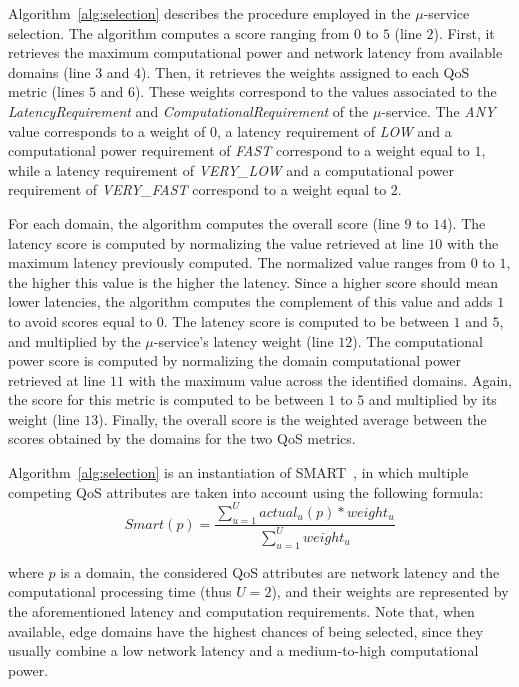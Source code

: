 Algorithm~\ref{alg:selection} describes the procedure employed in the $\mu$-service selection. The algorithm computes a score ranging from $0$ to $5$ (line $2$). First, it retrieves the maximum computational power and network latency from available domains (line $3$ and $4$). Then, it retrieves the weights assigned to each QoS metric (lines $5$ and $6$). These weights correspond to the values associated to the \textit{LatencyRequirement} and \textit{ComputationalRequirement} of the $\mu$-service. The \textit{ANY} value corresponds to a weight of $0$, a latency requirement of \textit{LOW} and a computational power requirement of \textit{FAST} correspond to a weight equal to $1$, while a latency requirement of \textit{VERY\_LOW} and a computational power requirement of \textit{VERY\_FAST} correspond to a weight equal to $2$. 

For each domain, the algorithm computes the overall score (line $9$ to $14$). The latency score is computed by normalizing the value retrieved at line $10$ with the maximum latency previously computed. The normalized value ranges from $0$ to $1$, the higher this value is the higher the latency. Since a higher score should mean lower latencies, the algorithm computes the complement of this value and adds $1$ to avoid scores equal to $0$. The latency score is computed to be between $1$ and $5$, and multiplied by the $\mu$-service's latency weight (line $12$). The computational power score is computed by normalizing the domain computational power retrieved at line $11$ with the maximum value across the identified domains. Again, the score for this metric is computed to be between $1$ to $5$ and multiplied by its weight (line $13$). Finally, the overall score is the weighted average between the scores obtained by the domains for the two QoS metrics.

Algorithm~\ref{alg:selection} is an instantiation of SMART~\cite{Olson1996}, in which multiple competing QoS attributes are taken into account using the following formula:
{\small
\begin{equation}
Smart(p) = \frac{\sum_{u=1}^{U} actual_{u}(p)*weight_u}{\sum_{u=1}^{U}weight_u} \label{eq:smart}
\end{equation}
}%

\noindent
where $p$ is a domain, the considered QoS attributes are network latency and the computational processing time (thus $U = 2$), and their weights are represented by the aforementioned latency and computation requirements. Note that, when available, edge domains have the highest chances of being selected, since they usually combine a low network latency and a medium-to-high computational power. 

